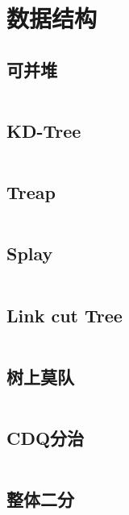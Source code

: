 \section{数据结构}
\subsection{可并堆}
\inputminted{cpp}{\source/data-structure/heap.cpp}
\subsection{KD-Tree}
\inputminted{cpp}{\source/data-structure/kd-tree.cpp}
\subsection{Treap}
\inputminted{cpp}{\source/data-structure/treap.cpp}
\subsection{Splay}
\inputminted{cpp}{\source/data-structure/spaly.cpp}
\subsection{Link cut Tree}
\inputminted{cpp}{\source/data-structure/link-cut-tree.cpp}
\subsection{树上莫队}
\inputminted{cpp}{\source/data-structure/mo'alogorithm-on-tree.cpp}
\subsection{CDQ分治}
\inputminted{cpp}{\source/data-structure/cdq.cpp}
\subsection{整体二分}
\inputminted{cpp}{\source/data-structure/general-binary.cpp}
